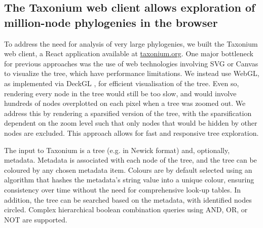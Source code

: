 \subsection*{The Taxonium web client allows exploration of million-node phylogenies in the browser}

To address the need for analysis of very large phylogenies, we built the Taxonium web client, a React application available at \href{http://taxonium.org}{taxonium.org}. One major bottleneck for previous approaches was the use of web technologies involving SVG or Canvas to visualize the tree, which have performance limitations. We instead use WebGL, as implemented via DeckGL \citep{deckgl}, for efficient visualisation of the tree. Even so, rendering every node in the tree would still be too slow, and would involve hundreds of nodes overplotted on each pixel when a tree was zoomed out. We address this by rendering a sparsified version of the tree, with the sparsification dependent on the zoom level such that only nodes that would be hidden by other nodes are excluded. This approach allows for fast and responsive tree exploration.

The input to Taxonium is a tree (e.g. in Newick format) and, optionally, metadata. Metadata is associated with each node of the tree, and the tree can be coloured by any chosen metadata item. Colours are by default selected using an algorithm that hashes the metadata's string value into a unique colour, ensuring consistency over time without the need for comprehensive look-up tables. In addition, the tree can be searched based on the metadata, with identified nodes circled. Complex hierarchical boolean combination queries using AND, OR, or NOT  are supported.

